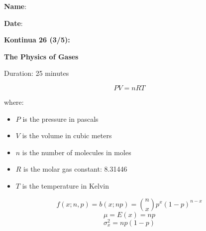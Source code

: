 \documentclass[letterpaper,12pt,addpoints]{exam}
\newcommand{\examnum}{Kontinua 26 (3/5)}
\newcommand{\content}{The Physics of Gases}
\begin{document}
\noindent \parbox{0.65\textwidth}{
\textbf{Name}:\ \hrulefill \\

\vspace{0.2cm}

\textbf{Date}:\ \hrulefill

\vspace{1.0cm}

\noindent \Large \textbf{\examnum :}

\Large \textbf{\content}

} 
\parbox{0.35\textwidth}{
\begin{flushright}\gradetable[v][questions]

\medskip

Duration: 25 minutes

\end{flushright}
}

\begin{mdframed}[frametitle={Ideal Gas Law}]

$$PV = nRT$$

where:
\begin{itemize}
\item[] $P$ is the pressure in pascals
\item[] $V$ is the volume in cubic meters
\item[] $n$ is the number of molecules in moles
\item[] $R$ is the molar gas constant: 8.31446
\item[] $T$ is the temperature in Kelvin
\end{itemize}
\end{mdframed}


\begin{mdframed}[style=important, frametitle={Binomial Distribution}]
$$f(x;n,p)=b(x;np)=\binom{n}{x}p^x(1-p)^{n-x}$$
$$\mu=E(x)=np$$
$$\sigma^2_x=np(1-p)$$
\end{mdframed}
\end{document}

